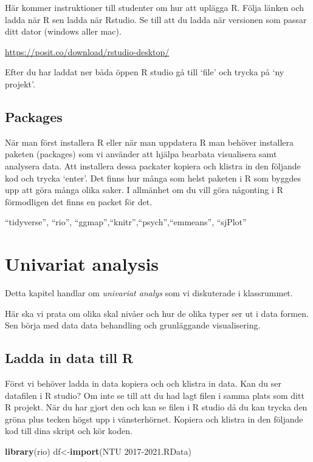 \documentclass[
]{book}
\newenvironment{Shaded}{\begin{snugshade}}{\end{snugshade}}
\newcommand{\FunctionTok}[1]{\textcolor[rgb]{0.13,0.29,0.53}{\textbf{#1}}}
\newcommand{\NormalTok}[1]{#1}
\newcommand{\OtherTok}[1]{\textcolor[rgb]{0.56,0.35,0.01}{#1}}
\newcommand{\StringTok}[1]{\textcolor[rgb]{0.31,0.60,0.02}{#1}}
\begin{document}
Här kommer instruktioner till studenter om hur att uplägga R. Följa länken och ladda när R sen ladda när Rstudio. Se till att du ladda när versionen som passar ditt dator (windows aller mac).

\url{https://posit.co/download/rstudio-desktop/}

Efter du har laddat ner båda öppen R studio gå till `file' och trycka på `ny projekt'.

\section{Packages}\label{packages}

När man först installera R eller när man uppdatera R man behöver installera paketen (packages) som vi använder att hjälpa bearbata visualisera samt analysera data. Att installera dessa packater kopiera och klistra in den följande kod och trycka `enter'. Det finns hur många som helst paketen i R som byggdes upp att göra många olika saker. I allmänhet om du vill göra någonting i R förmodligen det finns en packet för det.

``tidyverse'', ``rio'', ``ggmap'',``knitr'',``psych'',``emmeans'',
``sjPlot''

\chapter{Univariat analysis}\label{univariat-analysis}

Detta kapitel handlar om \emph{univariat analys} som vi diskuterade i
klassrummet.

Här ska vi prata om olika skal nivåer och hur de olika typer ser ut i
data formen. Sen börja med data data behandling och grunläggande
visualisering.

\section{Ladda in data till R}\label{ladda-in-data-till-r}

Först vi behöver ladda in data kopiera och och klistra in data. Kan du
ser datafilen i R studio? Om inte se till att du had lagt filen i samma
plats som ditt R projekt. När du har gjort den och kan se filen i R
studio då du kan trycka den gröna plus tecken högst upp i vänsterhörnet.
Kopiera och klistra in den följande kod till dina skript och kör koden.

\begin{Shaded}
\begin{Highlighting}[]
\FunctionTok{library}\NormalTok{(rio)}
\NormalTok{df}\OtherTok{\textless{}{-}}\FunctionTok{import}\NormalTok{(}\StringTok{\textquotesingle{}NTU 2017{-}2021.RData\textquotesingle{}}\NormalTok{)}
\end{Highlighting}
\end{Shaded}
\end{document}
